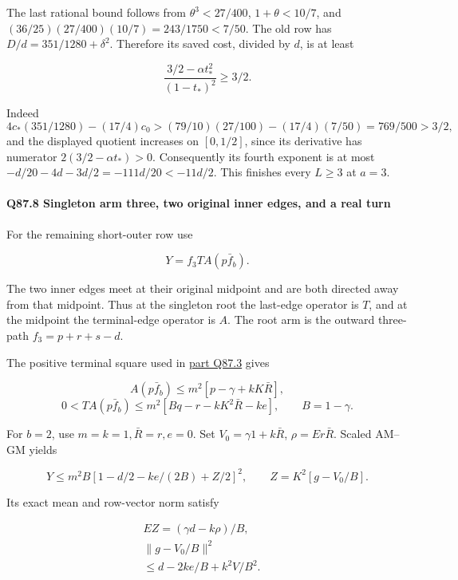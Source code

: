 The last rational bound follows from
\(\theta^3<\allowbreak 27/400\), \(1+\theta<\allowbreak 10/7\), and
\((36/25)(27/400)(10/7)=\allowbreak 243/1750<\allowbreak 7/50\).
The old row has \(D/d=\allowbreak 351/1280+\delta^2\). Therefore its saved
cost, divided by \(d\), is at least

\[
 \frac{3/2-\alpha t_*^2}{(1-t_*)^2}\ge3/2.
\]

Indeed
\[
4c_*(351/1280)-(17/4)c_0
>(79/10)(27/100)-(17/4)(7/50)=769/500>3/2,
\]
and the displayed quotient increases on \([0,\allowbreak  1/2]\), since its
derivative has numerator \(2(3/2-\alpha t_*)>\allowbreak 0\).
Consequently its fourth exponent is at most
\(-d/20-4d-3d/2=\allowbreak -111d/20<\allowbreak -11d/2\).
This finishes every \(L\ge\allowbreak 3\) at \(a=\allowbreak 3\).

\paragraph{Q87.8 Singleton arm three, two original inner edges, and a real turn}\label{part:Q87.8}

For the remaining short-outer row use

\[
 Y=f_3TA(p\bar f_b).
 \tag{Q87.8.1}\label{eq:Q87:8.1}
\]

The two inner edges meet at their original midpoint and are both
directed away from that midpoint. Thus at the singleton root the
last-edge operator is \(T\), and at the midpoint the terminal-edge
operator is \(A\). The root arm is the outward three-path \(f_3=\allowbreak p+r+s-d\).

The positive terminal square used in \hyperref[part:Q87.3]{part Q87.3} gives

\[
 A(p\bar f_b)\le m^2[p-\gamma+kK\bar R],
\]
\[
 0<TA(p\bar f_b)\le m^2[Bq-r-kK^2\bar R-ke],\qquad B=1-\gamma.
 \tag{Q87.8.2}\label{eq:Q87:8.2}
\]

For \(b=\allowbreak 2\), use \(m=\allowbreak k=\allowbreak 1,\allowbreak  \bar R=\allowbreak r,\allowbreak  e=\allowbreak 0\). Set
\(V_0=\allowbreak \gamma1+k\bar R\), \(\rho=\allowbreak Er\bar R\).
Scaled AM–GM yields

\[
 Y\le m^2B[1-d/2-ke/(2B)+Z/2]^2,\qquad
 Z=K^2[g-V_0/B].
 \tag{Q87.8.3}\label{eq:Q87:8.3}
\]

Its exact mean and row-vector norm satisfy

\[
\begin{gathered}
EZ=(\gamma d-k\rho)/B,\qquad\\
\|g-V_0/B\|^2\\
\le d-2ke/B+k^2V/B^2.
\end{gathered}\tag{Q87.8.4}\label{eq:Q87:8.4}
\]

